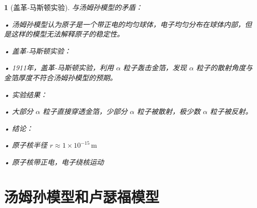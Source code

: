 \documentclass[UTF8]{report}
\theoremstyle{MyLineTheoremStyle} %
\theoremstyle{MyBlockTheoremStyle} %
\theoremstyle{MySubsubsectionStyle} %
\newtheorem{definition}{}
\begin{document}
\begin{definition}[盖革-马斯顿实验]
    与汤姆孙模型的矛盾：\par
    • 汤姆孙模型认为原子是一个带正电的均匀球体，电子均匀分布在球体内部，但是这样的模型无法解释原子的稳定性。\par
    • 盖革-马斯顿实验：\par
    • 1911年，盖革-马斯顿实验，利用 \(\alpha\) 粒子轰击金箔，发现 \(\alpha\) 粒子的散射角度与金箔厚度不符合汤姆孙模型的预期。\par
    • 实验结果：\par
    • 大部分 \(\alpha\) 粒子直接穿透金箔，少部分 \(\alpha\) 粒子被散射，极少数 \(\alpha\) 粒子被反射。\par
    • 结论：\par
    • 原子核半径 \(r \approx 1 \times 10^{-15} \, \text{m}\) \par
    • 原子核带正电，电子绕核运动 \par
\end{definition}

\section{汤姆孙模型和卢瑟福模型}
\end{document}
